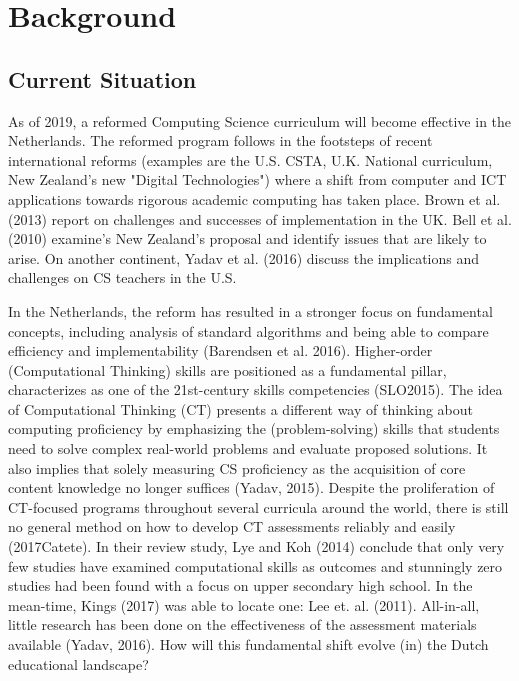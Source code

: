
\section{Background}\label{sec:background}

\subsection{Current Situation}


As of 2019, a reformed Computing Science curriculum will become effective in the Netherlands. The reformed program follows in the footsteps of recent international reforms (examples are the U.S. CSTA, U.K. National curriculum, New Zealand's new "Digital Technologies") where a shift from computer and ICT applications towards rigorous academic computing has taken place. Brown et al. (2013) report on challenges and successes of implementation in the UK. Bell et al. (2010) examine's New Zealand's proposal and identify issues that are likely to arise. On another continent, Yadav et al. (2016) discuss the implications and challenges on CS teachers in the U.S.

In the Netherlands, the reform has resulted in a stronger focus on fundamental concepts, including analysis of standard algorithms and being able to compare efficiency and implementability (Barendsen et al. 2016). Higher-order (Computational Thinking) skills are positioned as a fundamental pillar, characterizes as one of the 21st-century skills competencies (SLO2015). The idea of Computational Thinking (CT) presents a different way of thinking about computing proficiency by emphasizing the (problem-solving) skills that students need to solve complex real-world problems and evaluate proposed solutions. It also implies that solely measuring CS proficiency as the acquisition of core content knowledge no longer suffices (Yadav, 2015). Despite the proliferation of CT-focused programs throughout several curricula around the world, there is still no general method on how to develop CT assessments reliably and easily (2017Catete). In their review study, Lye and Koh (2014) conclude that only very few studies have examined computational skills as outcomes and stunningly zero studies had been found with a focus on upper secondary high school. In the mean-time, Kings (2017) was able to locate one: Lee et. al. (2011). All-in-all, little research has been done on the effectiveness of the assessment materials available (Yadav, 2016).
How will this fundamental shift evolve (in) the Dutch educational landscape?




